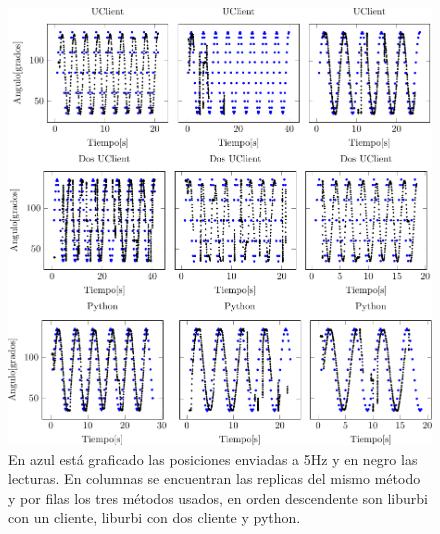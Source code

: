 \documentclass[12pt,a4paper,final,twoside]{book}
\begin{document}
\begin{figure}[H]
	\centering
   \includegraphics[scale=1]{plots/h5.pdf}
	 \caption{En azul está graficado las posiciones enviadas a 5Hz y en negro las lecturas. En columnas se encuentran las replicas del mismo método y por filas los tres métodos usados, en orden descendente son liburbi con un cliente, liburbi con dos cliente y python.}
  \label{fig:sin5H}
\end{figure}
\end{document}
